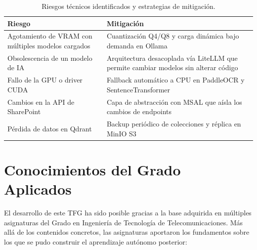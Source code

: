 \begin{table}[H]
\centering
\caption{Riesgos técnicos identificados y estrategias de mitigación.}
\label{tab:riesgos}
\begin{tabular}{p{5cm}p{7cm}}
\toprule
\textbf{Riesgo} & \textbf{Mitigación} \\
\midrule
Agotamiento de VRAM con múltiples modelos cargados & Cuantización Q4/Q8 y carga dinámica bajo demanda en Ollama \\
Obsolescencia de un modelo de IA & Arquitectura desacoplada vía LiteLLM que permite cambiar modelos sin alterar código \\
Fallo de la GPU o driver CUDA & Fallback automático a CPU en PaddleOCR y SentenceTransformer \\
Cambios en la API de SharePoint & Capa de abstracción con MSAL que aísla los cambios de endpoints \\
Pérdida de datos en Qdrant & Backup periódico de colecciones y réplica en MinIO S3 \\
\bottomrule
\end{tabular}
\end{table}

\section{Conocimientos del Grado Aplicados}
\label{sec:conocimientos-grado}

El desarrollo de este TFG ha sido posible gracias a la base adquirida en múltiples asignaturas del Grado en Ingeniería de Tecnología de Telecomunicaciones. Más allá de los contenidos concretos, las asignaturas aportaron los fundamentos sobre los que se pudo construir el aprendizaje autónomo posterior:

